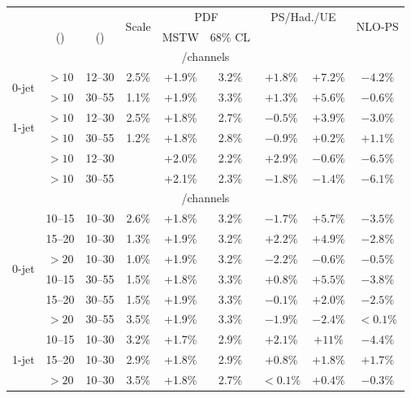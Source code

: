 \begin{table}
	\centering
	\begin{tabular}{ccc|cccccc}
		\toprule
		& \ptsubleadlep & \mll & \multirow{2}{*}{Scale} & \multicolumn{2}{c}{PDF} & \multicolumn{2}{c}{PS/Had./UE} & \multirow{2}{*}{NLO-PS} \\
		& (\GeV) & (\GeV) & & MSTW & 68\% CL & \pythia{6} & \fherwig & \\
		\midrule
		\multicolumn{9}{c}{\eech/\mmch channels} \\
		\midrule
		\multirow{2}{*}{0-jet}
		&  $>10$ & 12--30 & 2.5\% & +1.9\% & 3.2\% & $+1.8\%$ & $+7.2\%$ & $-4.2\%$ \\
		&  $>10$ & 30--55 & 1.1\% & +1.9\% & 3.3\% & $+1.3\%$ & $+5.6\%$ & $-0.6\%$ \\
		\midrule
		\multirow{2}{*}{1-jet}
		&  $>10$ & 12--30 & 2.5\% & +1.8\% & 2.7\% & $-0.5\%$ & $+3.9\%$ & $-3.0\%$ \\
		&  $>10$ & 30--55 & 1.2\% & +1.8\% & 2.8\% & $-0.9\%$ & $+0.2\%$ & $+1.1\%$ \\
		\midrule
		\multirow{2}{*}{\twojet}
		&  $>10$ & 12--30 &       & +2.0\% & 2.2\% & $+2.9\%$ & $-0.6\%$ & $-6.5\%$ \\
		&  $>10$ & 30--55 &       & +2.1\% & 2.3\% & $-1.8\%$ & $-1.4\%$ & $-6.1\%$ \\
		\midrule
		\multicolumn{9}{c}{\emch/\mech channels} \\
		\midrule
		\multirow{6}{*}{0-jet}
	    & 10--15 & 10--30 & 2.6\% & +1.8\% & 3.2\% & $-1.7\%$ & $+5.7\%$ & $-3.5\%$ \\
		& 15--20 & 10--30 & 1.3\% & +1.9\% & 3.2\% & $+2.2\%$ & $+4.9\%$ & $-2.8\%$ \\
		&  $>20$ & 10--30 & 1.0\% & +1.9\% & 3.2\% & $-2.2\%$ & $-0.6\%$ & $-0.5\%$ \\
		& 10--15 & 30--55 & 1.5\% & +1.8\% & 3.3\% & $+0.8\%$ & $+5.5\%$ & $-3.8\%$ \\
		& 15--20 & 30--55 & 1.5\% & +1.9\% & 3.3\% & $-0.1\%$ & $+2.0\%$ & $-2.5\%$ \\
		&  $>20$ & 30--55 & 3.5\% & +1.9\% & 3.3\% & $-1.9\%$ & $-2.4\%$ & $<0.1\%$ \\
		\midrule
		\multirow{6}{*}{1-jet}
	    & 10--15 & 10--30 & 3.2\% & +1.7\% & 2.9\% & $+2.1\%$ & $+11\%$  & $-4.4\%$ \\
		& 15--20 & 10--30 & 2.9\% & +1.8\% & 2.9\% & $+0.8\%$ & $+1.8\%$ & $+1.7\%$ \\
		&  $>20$ & 10--30 & 3.5\% & +1.8\% & 2.7\% & $<0.1\%$ & $+0.4\%$ & $-0.3\%$ \\

\end{tabular}
\end{table}
